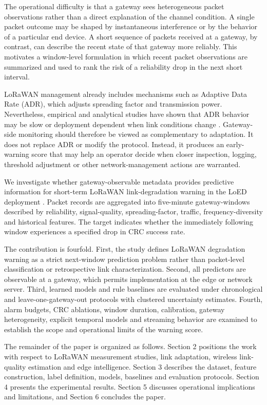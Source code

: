 \documentclass{jot}
\begin{document}
The operational difficulty is that a gateway sees heterogeneous packet observations rather than a direct explanation of the channel condition. A single packet outcome may be shaped by instantaneous interference or by the behavior of a particular end device. A short sequence of packets received at a gateway, by contrast, can describe the recent state of that gateway more reliably. This motivates a window-level formulation in which recent packet observations are summarized and used to rank the risk of a reliability drop in the next short interval.

LoRaWAN management already includes mechanisms such as Adaptive Data Rate (ADR), which adjusts spreading factor and transmission power. Nevertheless, empirical and analytical studies have shown that ADR behavior may be slow or deployment dependent when link conditions change \cite{5,6,7}. Gateway-side monitoring should therefore be viewed as complementary to adaptation. It does not replace ADR or modify the protocol. Instead, it produces an early-warning score that may help an operator decide when closer inspection, logging, threshold adjustment or other network-management actions are warranted.

We investigate whether gateway-observable metadata provides predictive information for short-term LoRaWAN link-degradation warning in the LoED deployment \cite{8}. Packet records are aggregated into five-minute gateway-windows described by reliability, signal-quality, spreading-factor, traffic, frequency-diversity and historical features. The target indicates whether the immediately following window experiences a specified drop in CRC success rate.

The contribution is fourfold. First, the study defines LoRaWAN degradation warning as a strict next-window prediction problem rather than packet-level classification or retrospective link characterization. Second, all predictors are observable at a gateway, which permits implementation at the edge or network server. Third, learned models and rule baselines are evaluated under chronological and leave-one-gateway-out protocols with clustered uncertainty estimates. Fourth, alarm budgets, CRC ablations, window duration, calibration, gateway heterogeneity, explicit temporal models and streaming behavior are examined to establish the scope and operational limits of the warning score.

The remainder of the paper is organized as follows. Section 2 positions the work with respect to LoRaWAN measurement studies, link adaptation, wireless link-quality estimation and edge intelligence. Section 3 describes the dataset, feature construction, label definition, models, baselines and evaluation protocols. Section 4 presents the experimental results. Section 5 discusses operational implications and limitations, and Section 6 concludes the paper.
\end{document}
